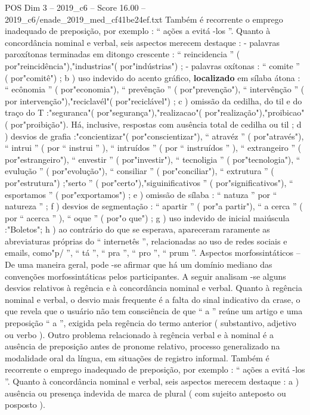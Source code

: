 \begin{textsample}{POS Dim 3 – 2019\_c6 – Score 16.00 – 2019\_c6/enade\_2019\_med\_cf41be24ef.txt}
Também é recorrente o emprego inadequado de preposição, por exemplo : “ ações a evitá -los ”.
Quanto à concordância nominal e verbal, seis aspectos merecem destaque : - palavras paroxítonas terminadas em ditongo crescente : “ reincidencia ” ( por"reincidência"),"industrias"( por"indústrias") ; - palavras oxítonas : “ comite ” ( por"comitê") ; b ) uso indevido do acento gráfico, \textbf{localizado} em sílaba átona : “ ecônomia ” ( por"economia"), “ prevênção ” ( por"prevenção"), “ intervênção ” ( por intervenção"),"reciclavél"( por"reciclável") ; c ) omissão da cedilha, do til e do traço do T :"seguranca"( por"segurança"),"realizacao"( por"realização"),"proibicao"( por"proibição").
Há, inclusive, respostas com ausência total de cedilha ou til ; d ) desvios de grafia :"concientizar"( por"conscientizar"), “ atravéz ” ( por"através"), “ intrui ” ( por “ instrui ” ), “ intruídos ” ( por “ instruídos ” ), “ extrangeiro ” ( por"estrangeiro"), “ envestir ” ( por"investir"), “ tecnoligia ” ( por"tecnologia"), “ evulução ” ( por"evolução"), “ consiliar ” ( por"conciliar"), “ extrutura ” ( por"estrutura") ;"serto ” ( por"certo"),"siguinificativos ” ( por"significativos"), “ esportamos ” ( por"exportamos") ; e ) omissão de sílaba : “ natuza ” por “ natureza ” ; f ) desvios de segmentação : “ apartir ” ( por"a partir"), “ a cerca ” ( por “ acerca ” ), “ oque ” ( por"o que") ; g ) uso indevido de inicial maiúscula :"Boletos"; h ) ao contrário do que se esperava, apareceram raramente as abreviaturas próprias do “ internetês ”, relacionadas ao uso de redes sociais e emails, como"p/ ”, “ tá ”, “ pra ”, “ pro ”, “ prum ”.
Aspectos morfossintáticos – De uma maneira geral, pode -se afirmar que há um domínio mediano das convenções morfossintáticas pelos participantes.
A seguir analisam -se alguns desvios relativos à regência e à concordância nominal e verbal.
Quanto à regência nominal e verbal, o desvio mais frequente é a falta do sinal indicativo da crase, o que revela que o usuário não tem consciência de que “ a ” reúne um artigo e uma preposição “ a ”, exigida pela regência do termo anterior ( substantivo, adjetivo ou verbo ).
Outro problema relacionado à regência verbal e à nominal é a ausência de preposição antes de pronome relativo, processo generalizado na modalidade oral da língua, em situações de registro informal.
Também é recorrente o emprego inadequado de preposição, por exemplo : “ ações a evitá -los ”.
Quanto à concordância nominal e verbal, seis aspectos merecem destaque : a ) ausência ou presença indevida de marca de plural ( com sujeito anteposto ou posposto ).

\end{textsample}
